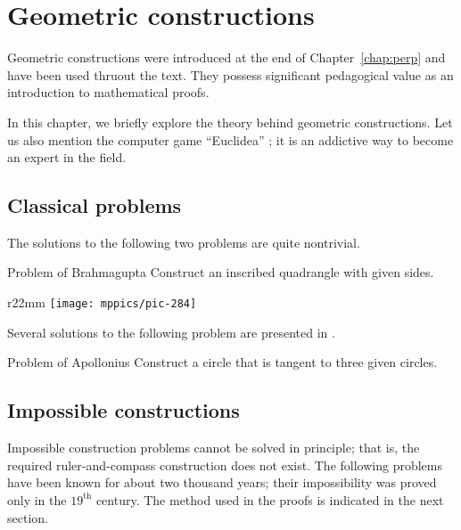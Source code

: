 \chapter{Geometric constructions}
\label{chap:car}

Geometric constructions were introduced at the end of Chapter~\ref{chap:perp} and have been used thruout the text.
They possess significant pedagogical value as an introduction to mathematical proofs.

In this chapter, we briefly explore the theory behind geometric constructions.
Let us also mention the computer game ``Euclidea'' \cite{euclidea};
it is an addictive way to become an expert in the field.


%
%

\section{Classical problems}

The solutions to the following two problems are quite nontrivial.

\begin{thm}{Problem of Brahmagupta} 
Construct an inscribed quadrangle with given sides.
\end{thm}

{

\begin{wrapfigure}[7]{r}{22mm}
\vskip-7mm
\centering
\texttt{[image: mppics/pic-284]}
\end{wrapfigure}

Several solutions to the following problem are presented in \cite{hadamard}.
 
\begin{thm}{Problem of Apollonius} Construct a circle that is tangent to three given circles.
\end{thm}

}

\section{Impossible constructions}

Impossible construction problems cannot be solved in principle; 
that is, the required ruler-and-compass construction does not exist.
The following problems have been known for about two thousand years;
their impossibility was proved only in the $19^\text{th}$ century.
The method used in the proofs is indicated in the next section.



